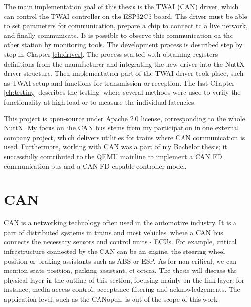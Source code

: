 \documentclass{ctuthesis}
\begin{document}
 \quad The main implementation goal of this thesis is the TWAI (CAN) driver, which can control the TWAI controller on the ESP32C3 board. The driver must be able to set parameters for communication, prepare a chip to connect to a live network, and finally communicate. It is possible to observe this communication on the other station by monitoring tools. The development process is described step by step in Chapter \ref{ch:driver}. The process started with obtaining registers definitions from the manufacturer and integrating the new driver into the NuttX driver structure. Then implementation part of the TWAI driver took place, such as TWAI setup and functions for transmission or reception. The last Chapter \ref{ch:testing} describes the testing, where several methods were used to verify the functionality at high load or to measure the individual latencies. \newline

 \quad This project is open-source under Apache 2.0 license, corresponding to the whole NuttX.
My focus on the CAN bus stems from my participation in one external company project, which delivers utilities for trains where CAN communication is used. Furthermore, working with CAN was a part of my Bachelor thesis\cite{bachelor-thesis}; it successfully contributed to the QEMU mainline to implement a CAN FD communication bus and a CAN FD capable controller model\cite{qemu}. 


\chapter{CAN}
\label{ch:can}
 CAN is a networking technology often used in the automotive industry. It is a part of distributed systems in trains and most vehicles, where a CAN bus connects the necessary sensors and control units - ECUs\cite{ecu}. For example, critical infrastructure connected by the CAN can be an engine, the steering wheel position or braking assistants such as ABS or ESP. As for non-critical, we can mention seats position, parking assistant, et cetera. The thesis will discuss the physical layer in the outline of this section, focusing mainly on the link layer: for instance, media access control, acceptance filtering and acknowledgements. The application level, such as the CANopen, is out of the scope of this work.
 
\end{document}
